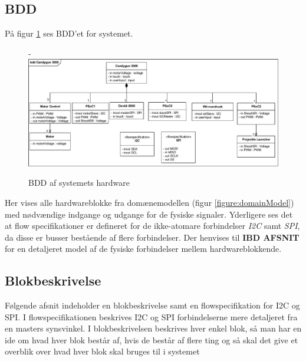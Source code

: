 \subsection{BDD}
\label{afsnit:BDD}
På figur \ref{figure:bddDiagram} ses BDD'et for systemet.

\begin{figure}[H]
	\begin{adjustwidth}{-3cm}{-\rightmargin}
	\centering
	\includegraphics[width=0.9\paperwidth]{SystemArkitektur/images/bddDiagram}
	\caption{BDD af systemets hardware}
	\label{figure:bddDiagram}
	\end{adjustwidth}
\end{figure}

\noindent Her vises alle hardwareblokke fra domænemodellen (figur \ref{figure:domainModel}) med nødvændige indgange og udgange for de fysiske signaler. Yderligere ses det at flow specifikationer er defineret for de ikke-atomare forbindelser \textit{I2C} samt \textit{SPI}, da disse er busser bestående af flere forbindelser. Der henvises til \textbf{IBD AFSNIT} for en detaljeret model af de fysiske forbindelser mellem hardwareblokkende.

\subsection{Blokbeskrivelse}
Følgende afsnit indeholder en blokbeskrivelse samt en flowspecifikation for I2C og SPI. I flowspecifikationen beskrives I2C og SPI forbindelserne mere detaljeret fra en masters synsvinkel.  I blokbeskrivelsen beskrives hver enkel blok, så man har en ide om hvad hver blok består af, hvis de består af flere ting og så skal det give et overblik over hvad hver blok skal bruges til i systemet \newline \newline

